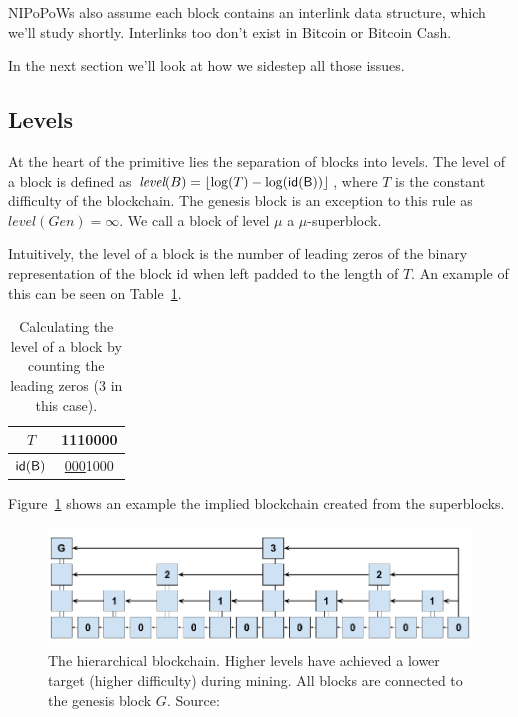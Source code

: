 
NIPoPoWs also assume each block contains an interlink data structure, which we'll study shortly. Interlinks too don't exist in Bitcoin or Bitcoin Cash.

In the next section we'll look at how we sidestep all those issues.

\subsection{Levels}
At the heart of the primitive lies the separation of blocks into levels. The level of a block is defined as $\textit{level}(B) = \left \lfloor \log(T) - \log(\sf{id}(B)) \right \rfloor$, where $T$ is the constant difficulty of the blockchain. The genesis block is an exception to this rule as $\textit{level}(Gen) = \infty$. We call a block of level $\mu$ a $\mu$-superblock.

Intuitively, the level of a block is the number of leading zeros of the binary representation of the block id when left padded to the length of $T$. An example of this can be seen on Table~\ref{table:level-counting}.

\begin{table}
  \centering
  \begin{tabular}{|c|c|}
    \hline
    $T$ & 1110000 \\
    \hline
    $\sf{id}(B)$ & \underline{000}1000 \\
    \hline
  \end{tabular}
  \caption{Calculating the level of a block by counting the leading zeros (3 in this case).}
  \label{table:level-counting}
\end{table}

Figure~\ref{fig:hierarchy} shows an example the implied blockchain created from the superblocks.

\begin{figure}
  \centering
  \includegraphics[width=0.9\columnwidth,keepaspectratio]{figures/hierarchical-ledger.png}
  \caption{The hierarchical blockchain.  Higher levels have achieved a lower target (higher difficulty) during mining. All blocks are connected to the genesis block $G$. Source:~\cite{nipopows}}
  \label{fig:hierarchy}
\end{figure}

